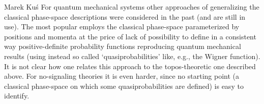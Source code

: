 \begin{artengenv}{Marek Ku\'s}
 For quantum mechanical systems other approaches of generalizing the classical phase-space descriptions were considered in the past (and are still in use). The most popular employs the classical phase-space parameterized by positions and momenta at the price of lack of possibility to define in a consistent way positive-definite probability functions reproducing quantum mechanical results (using instead so called `quasiprobabilities' like, e.g., the Wigner function). It is not clear how one relates this approach to the topos-theoretic one described above. For no-signaling theories it is even harder, since no starting point (a classical phase-space on which some quasiprobabilities are defined) is easy to identify.    

\end{artengenv}
